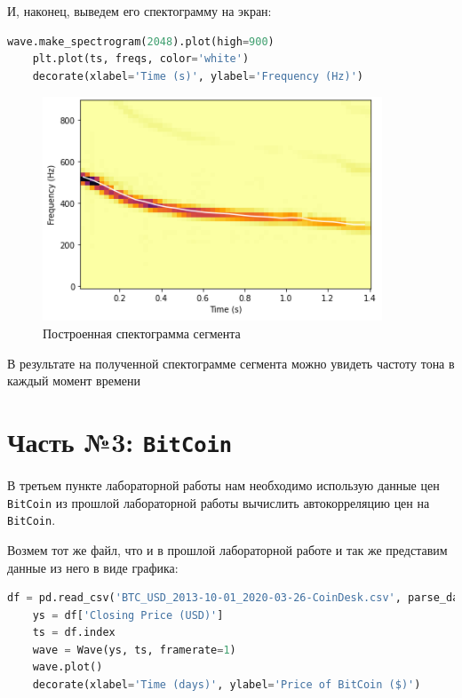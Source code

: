 \documentclass[a4paper]{article}
\begin{document}
            И, наконец, выведем его спектограмму на экран:
            
\begin{lstlisting}[language=Python, caption= Вывод спектограммы сегмента]
    wave.make_spectrogram(2048).plot(high=900)
    plt.plot(ts, freqs, color='white')
    decorate(xlabel='Time (s)', ylabel='Frequency (Hz)')
\end{lstlisting}               
            
            \begin{figure}[H]
                \centering
                \includegraphics{ex_2_spectogramma_last.png}
                \caption{Построенная спектограмма сегмента}
                \label{fig:ex_2_spectogramma_last}
            \end{figure}
            
            В результате на полученной спектограмме сегмента можно увидеть частоту тона в каждый момент времени

    \newpage
        \section{Часть №3: \texttt{BitCoin}}
            В третьем пункте лабораторной работы нам необходимо использую данные цен \texttt{BitCoin} из прошлой лабораторной работы вычислить автокорреляцию цен на \texttt{BitCoin}.
            
            Возмем тот же файл, что и в прошлой лабораторной работе и так же представим данные из него в виде графика:
            
\begin{lstlisting}[language=Python, caption= Представление данных файла в виде графика]
    df = pd.read_csv('BTC_USD_2013-10-01_2020-03-26-CoinDesk.csv', parse_dates=[0])
    ys = df['Closing Price (USD)']
    ts = df.index
    wave = Wave(ys, ts, framerate=1)
    wave.plot()
    decorate(xlabel='Time (days)', ylabel='Price of BitCoin ($)')
\end{lstlisting}               
            
\end{document}
